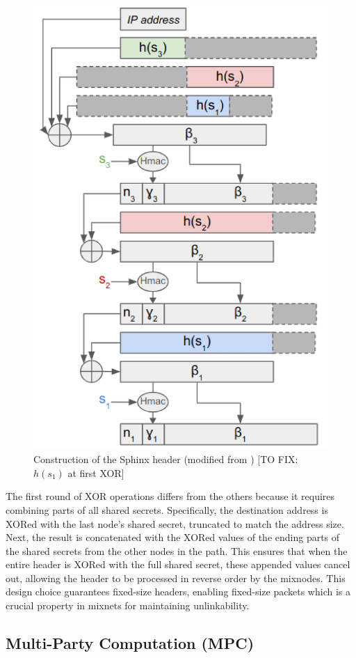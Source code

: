 \begin{figure}[H]
    \centering
    \includegraphics[width=0.5\linewidth]{Images/header_cipher.png}
    \caption{Construction of the Sphinx header (modified from \cite{sphinx}) [TO FIX: $h(s_1)$ at first XOR]}
    \label{fig:header_cipher}
\end{figure}

The first round of XOR operations differs from the others because it requires combining parts of all shared secrets. 
Specifically, the destination address is XORed with the last node’s shared secret, truncated to match the address size.
Next, the result is concatenated with the XORed values of the ending parts of the shared secrets from the other nodes in the path. 
This ensures that when the entire header is XORed with the full shared secret, these appended values cancel out, allowing the header to be processed in reverse order by the mixnodes.
This design choice guarantees fixed-size headers, enabling fixed-size packets which is a crucial property in mixnets for maintaining unlinkability.




\subsection{Multi-Party Computation (MPC)}

